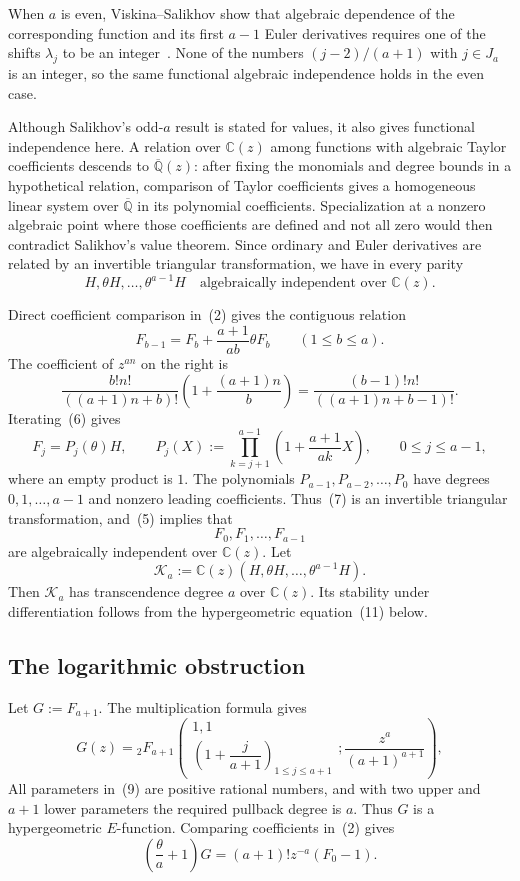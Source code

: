 \documentclass[12pt]{article}
\begin{document}
When $a$ is even, Viskina--Salikhov show that algebraic dependence of the corresponding function and its first $a-1$ Euler derivatives requires one of the shifts $\lambda_j$ to be an integer~\cite[p.~833]{salikhov-viskina}. None of the numbers $(j-2)/(a+1)$ with $j\in J_a$ is an integer, so the same functional algebraic independence holds in the even case.

Although Salikhov's odd-$a$ result is stated for values, it also gives functional independence here. A relation over $\mathbb C(z)$ among functions with algebraic Taylor coefficients descends to $\overline{\mathbb Q}(z)$: after fixing the monomials and degree bounds in a hypothetical relation, comparison of Taylor coefficients gives a homogeneous linear system over $\overline{\mathbb Q}$ in its polynomial coefficients. Specialization at a nonzero algebraic point where those coefficients are defined and not all zero would then contradict Salikhov's value theorem. Since ordinary and Euler derivatives are related by an invertible triangular transformation, we have in every parity
\[
H,\theta H,\ldots,\theta^{a-1}H
\quad\text{algebraically independent over }\mathbb C(z).
\tag{5}
\]

Direct coefficient comparison in~(2) gives the contiguous relation
\[
F_{b-1}=F_b+\frac{a+1}{ab}\theta F_b
\qquad(1\leq b\leq a).
\tag{6}
\]
The coefficient of $z^{an}$ on the right is
\[
\frac{b!n!}{((a+1)n+b)!}
\left(1+\frac{(a+1)n}{b}\right)
=\frac{(b-1)!n!}{((a+1)n+b-1)!}.
\]
Iterating~(6) gives
\[
F_j=P_j(\theta)H,
\qquad
P_j(X):=\prod_{k=j+1}^{a-1}
\left(1+\frac{a+1}{ak}X\right),
\qquad 0\leq j\leq a-1,
\tag{7}
\]
where an empty product is $1$. The polynomials $P_{a-1},P_{a-2},\ldots,P_0$ have degrees $0,1,\ldots,a-1$ and nonzero leading coefficients. Thus~(7) is an invertible triangular transformation, and~(5) implies that
\[
F_0,F_1,\ldots,F_{a-1}
\tag{8}
\]
are algebraically independent over $\mathbb C(z)$. Let
\[
\mathcal K_a:=\mathbb C(z)(H,\theta H,\ldots,\theta^{a-1}H).
\]
Then $\mathcal K_a$ has transcendence degree $a$ over $\mathbb C(z)$. Its stability under differentiation follows from the hypergeometric equation~(11) below.

\subsection{The logarithmic obstruction}

Let $G:=F_{a+1}$. The multiplication formula gives
\[
G(z)={}_2F_{a+1}\!\left(
\begin{matrix}1,1\\\left(1+\dfrac{j}{a+1}\right)_{1\leq j\leq a+1}\end{matrix};
\frac{z^a}{(a+1)^{a+1}}
\right),
\tag{9}
\]
All parameters in~(9) are positive rational numbers, and with two upper and $a+1$ lower parameters the required pullback degree is $a$. Thus $G$ is a hypergeometric $E$-function. Comparing coefficients in~(2) gives
\[
\left(\frac{\theta}{a}+1\right)G
=(a+1)!z^{-a}(F_0-1).
\tag{10}
\]
\end{document}
